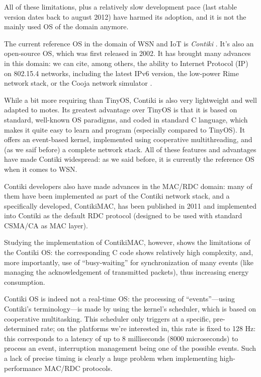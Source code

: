 \documentclass[a4paper,twoside]{article}
\begin{document}
All of these limitations, plus a relatively slow development pace (last
stable version dates back to august 2012) have harmed its adoption,
and it is not the mainly used OS of the domain anymore.


The current reference OS in the domain of WSN and IoT is \emph{Contiki}
\cite{ContikiOS}. It's also an open-source OS, which was first released
in 2002. It has brought many advances in this domain: we can cite,
among others, the ability to Internet Protocol (IP) on 802.15.4 networks,
including the latest IPv6 version, the low-power Rime network stack,
or the Cooja network simulator \cite{Cooja}.

While a bit more requiring than TinyOS, Contiki is also very lightweight
and well adapted to motes. Its greatest advantage over TinyOS is that
it is based on standard, well-known OS paradigms, and coded in standard
C language, which makes it quite easy to learn and program (especially
compared to TinyOS). It offers an event-based kernel, implemented
using cooperative multithreading, and (as we saif before) a complete
network stack. All of these features and advantages have made
Contiki widespread: as we said before, it is currently the reference
OS when it comes to WSN.

Contiki developers also have made advances in the MAC/RDC domain: many
of them have been implemented as part of the Contiki network stack, and
a specifically developed, ContikiMAC, has been published in 2011
\cite{ContikiMAC} and implemented into Contiki as the default
RDC protocol (designed to be used with standard CSMA/CA as MAC layer).

Studying the implementation of ContikiMAC, however, shows the limitations
of the Contiki OS: the corresponding C code shows relatively high complexity,
and, more importantly, use of ``busy-waiting'' for synchronization of many
events (like managing the acknowledgement of transmitted packets), thus
increasing energy consumption.

Contiki OS is indeed not a real-time OS: the processing of ``events''---using
Contiki's terminology---is made by using the kernel's scheduler, which is
based on cooperative multitasking. This scheduler only triggers at a specific,
pre-determined rate; on the platforms we're interested in, this rate is
fixed to 128 Hz: this corresponds to a latency of up to 8 milliseconds
(8000 microseconds) to process an event, interruption management being
one of the possible events. Such a lack of precise timing is clearly
a huge problem when implementing high-performance MAC/RDC protocols.
\end{document}
